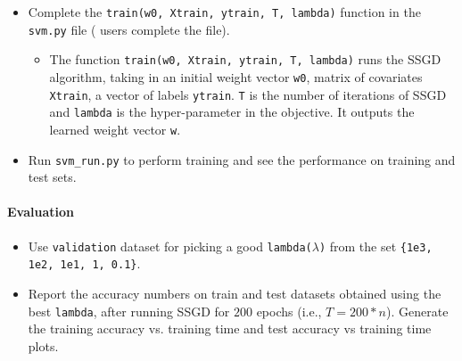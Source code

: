 \begin{itemize}
\item Complete the \texttt{train(w0, Xtrain, ytrain, T, lambda)} function in the \texttt{svm.py} file ( users complete the  file).
\begin{itemize}

\item The function \texttt{train(w0, Xtrain, ytrain, T, lambda)} runs the SSGD algorithm, taking in an initial weight vector \texttt{w0}, matrix of covariates \texttt{Xtrain}, a vector of labels \texttt{ytrain}. \texttt{T} is the number of iterations of SSGD and \texttt{lambda} is the hyper-parameter in the objective. It outputs the learned weight vector \texttt{w}.
\end{itemize}
\item Run \texttt{svm\_run.py} to perform training and see the performance on training and test sets.
\end{itemize}

\paragraph{Evaluation}
\begin{itemize}
\item Use \texttt{validation}  dataset for picking a good \texttt{lambda($\lambda$)} from the set \texttt{\{1e3, 1e2, 1e1, 1, 0.1\}}.
\item Report the accuracy numbers on train and test datasets obtained using the best \texttt{lambda}, after running SSGD for $200$ epochs (i.e., $T = 200*n$).  Generate the training accuracy vs. training time and test accuracy vs training time plots.
\end{itemize}

\begin{soln}
\end{soln}

